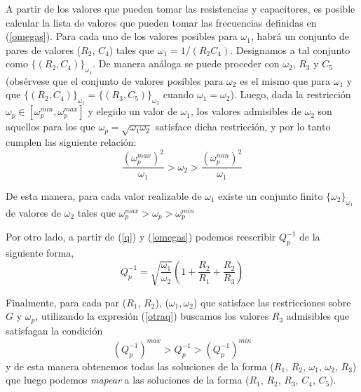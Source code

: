 \documentclass{llncs}
\begin{document}
    
    A partir de los valores que pueden tomar las resistencias y capacitores, es
    posible calcular la lista de valores que pueden tomar las frecuencias
    definidas en (\ref{omegas}). Para cada uno de los valores posibles para
    $\omega_1$, habrá un conjunto de pares de valores ($R_2$, $C_4$) tales que
    $\omega_1 = 1/(R_2 C_4)$. Designamos a tal conjunto como $\{(R_2,
      C_4)\}_{\omega_1}$. De manera análoga se puede proceder con $\omega_2$,
      $R_3$ y $C_5$ (obsérvese que el conjunto de valores posibles para $\omega_2$
      es el mismo que para $\omega_1$ y que $\{(R_2,C_4)\}_{\omega_1}=\{(R_3,
      C_5)\}_{\omega_2}$ cuando $\omega_1=\omega_2$). Luego, dada la restricción $\omega_p \in 
    [\omega_p^{min},\omega_p^{max}]$ y elegido un valor de  $\omega_1$, los
    valores admisibles de $\omega_2$ son aquellos para los 
    que $\omega_p= \sqrt{\omega_1 \omega_2}$ satisface dicha restricción, y
    por lo tanto cumplen las siguiente relación:
    \begin{equation*}
    \frac{(\omega_p^{max})^2}{\omega_1} > \omega_2 > \frac{(\omega_p^{min})^2}{\omega_1}
    \end{equation*}

    De esta manera, para cada valor realizable de $\omega_1$ existe un conjunto
    finito $\{{\omega_2}\}_{\omega_1}$ de valores de $\omega_2$ 
    tales que $ \omega_p^{max} > \omega_p > \omega_p^{min} $

    Por otro lado, a partir de (\ref{q}) y (\ref{omegas}) podemos reescribir
    $Q_p^{-1}$ de la siguiente forma,
    \begin{equation}
    Q_p^{-1} =
    \sqrt{\frac{\omega_1}{\omega_2}}\left(1+\frac{R_2}{R_1}+\frac{R_2}{R_3}\right)
    \label{otraq}
    \end{equation}
    
    Finalmente, para cada par ($R_1$, $R_2$), ($\omega_1, \omega_2$) que satisface
    las restricciones sobre $G$ y $\omega_p$, utilizando la expresión
    (\ref{otraq}) buscamos los valores $R_3$ admisibles que satisfagan la  condición
    $$
    (Q_p^{-1})^{max} > Q_p^{-1} > (Q_p^{-1})^{min}
    $$
    y de esta manera obtenemos todas las soluciones de la forma ($R_1$, $R_2$,
    $\omega_1$, $\omega_2$, $R_3$)  
    que luego podemos \textit{mapear} a las soluciones de la forma ($R_1$,
    $R_2$, $R_3$, $C_4$, $C_5$). 
\end{document}
